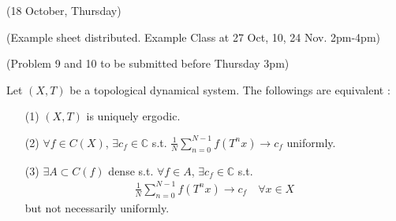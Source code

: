 \documentclass[10pt,a4paper]{report}
\begin{document}
\newday

(18 October, Thursday)
\s

(Example sheet distributed. Example Class at 27 Oct, 10, 24 Nov. 2pm-4pm)

(Problem 9 and 10 to be submitted before Thursday 3pm)
\s

\thm Let $(X,T)$ be a topological dynamical system. The followings are equivalent :
\begin{itemize}
\item[(1)] $(X,T)$ is uniquely ergodic.
\item[(2)] $\forall f \in C(X)$, $\exists c_f \in \mathbb{C}$ s.t. $\frac{1}{N}\sum_{n=0}^{N-1} f(T^n x) \rightarrow c_f$ uniformly.
\item[(3)] $\exists A \subset C(f)$ dense s.t. $\forall f\in A$, $\exists c_f \in \mathbb{C}$ s.t.
\begin{align*}
\frac{1}{N} \sum_{n=0}^{N-1} f(T^n x) \rightarrow c_f \quad \forall x \in X
\end{align*}
but not necessarily uniformly.
\end{itemize}
\end{document}

